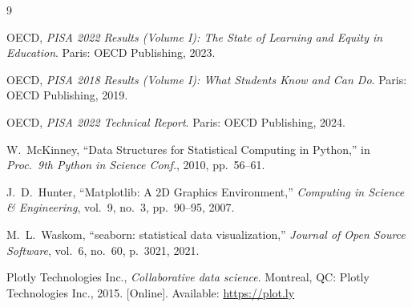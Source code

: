 \documentclass[conference]{IEEEtran}
\begin{document}
\begin{thebibliography}{9}

OECD, \emph{PISA 2022 Results (Volume I): The State of Learning and Equity in Education}. Paris: OECD Publishing, 2023.

OECD, \emph{PISA 2018 Results (Volume I): What Students Know and Can Do}. Paris: OECD Publishing, 2019.

OECD, \emph{PISA 2022 Technical Report}. Paris: OECD Publishing, 2024.

W.~McKinney, ``Data Structures for Statistical Computing in Python,'' in \emph{Proc.\ 9th Python in Science Conf.}, 2010, pp.\ 56--61.

J.~D.~Hunter, ``Matplotlib: A 2D Graphics Environment,'' \emph{Computing in Science \& Engineering}, vol.\ 9, no.\ 3, pp.\ 90--95, 2007.

M.~L.~Waskom, ``seaborn: statistical data visualization,'' \emph{Journal of Open Source Software}, vol.\ 6, no.\ 60, p.\ 3021, 2021.

Plotly Technologies Inc., \emph{Collaborative data science}. Montreal, QC: Plotly Technologies Inc., 2015. [Online]. Available: \url{https://plot.ly}

\end{thebibliography}
\end{document}

